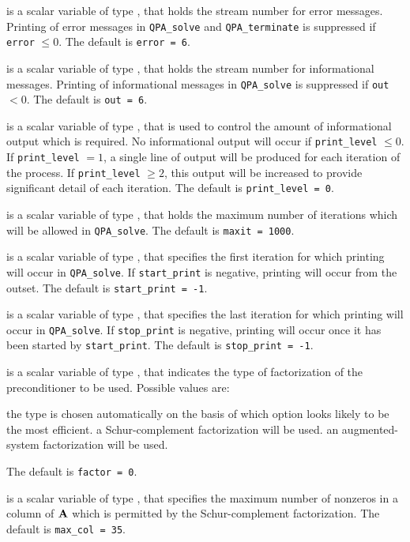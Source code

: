 \begin{description}

 is a scalar variable of type \integer, that holds the
stream number for error messages. Printing of error messages in
{\tt QPA\_solve} and {\tt QPA\_terminate}
is suppressed if {\tt error} $\leq 0$.
The default is {\tt error = 6}.

 is a scalar variable of type \integer, that holds the
stream number for informational messages. Printing of informational messages in
{\tt QPA\_solve} is suppressed if {\tt out} $< 0$.
The default is {\tt out = 6}.

 is a scalar variable of type \integer, that is used
to control the amount of informational output which is required. No
informational output will occur if {\tt print\_level} $\leq 0$. If
{\tt print\_level} $= 1$, a single line of output will be produced for each
iteration of the process. If {\tt print\_level} $\geq 2$, this output will be
increased to provide significant detail of each iteration.
The default is {\tt print\_level = 0}.

 is a scalar variable of type \integer, that holds the
maximum number of iterations which will be allowed in {\tt QPA\_solve}.
The default is {\tt maxit = 1000}.

 is a scalar variable of type \integer, that specifies
the first iteration for which printing will occur in {\tt QPA\_solve}.
If {\tt start\_print} is negative, printing will occur from the outset.
The default is {\tt start\_print = -1}.

 is a scalar variable of type \integer, that specifies
the last iteration for which printing will occur in  {\tt QPA\_solve}.
If {\tt stop\_print} is negative, printing will occur once it has been
started by {\tt start\_print}.
The default is {\tt stop\_print = -1}.

 is a scalar variable of type \integer, that indicates
the type of factorization of the preconditioner to be used.
Possible values are:

\begin{description}
 the type is chosen automatically on the basis of which option looks
        likely to be the most efficient.
 a Schur-complement factorization will be used.
 an augmented-system factorization will be used.
\end{description}
The default is {\tt factor = 0}.

 is a scalar variable of type \integer, that specifies
the maximum number of nonzeros in a column of ${\mathbf{A}}$ which is permitted
by the Schur-complement factorization.
The default is {\tt max\_col = 35}.


\end{description}
